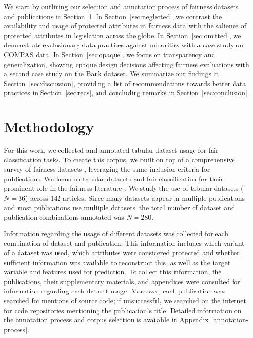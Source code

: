 We start by outlining our selection and annotation process of fairness datasets and publications in Section~\ref{sec:methods}. 
In Section~\ref{sec:neglected}, we contrast the availability and usage of protected attributes in fairness data with the salience of protected attributes in legislation across the globe. In Section~\ref{sec:omitted}, we demonstrate exclusionary data practices against minorities with a case study on COMPAS data. In Section~\ref{sec:opaque}, we focus on transparency and generalization, showing opaque design decisions affecting fairness evaluations with a second case study on the Bank dataset. We summarize our findings in Section~\ref{sec:discussion}, providing a list of recommendations towards better data practices in Section~\ref{sec:recs}, and concluding remarks in Section~\ref{sec:conclusion}.

\section{Methodology} \label{sec:methods}

For this work, we collected and annotated tabular dataset usage for fair classification tasks. To create this corpus, we built on top of a comprehensive survey of fairness datasets \citep{fabris2022algorithmic}, leveraging the same inclusion criteria for publications. We focus on tabular datasets and fair classification for their prominent role in the fairness literature \citep{fabris2022algorithmic,fabris2022tackling,mehrabi2022survey}. We study the use of tabular datasets ($N=36$) across 142 articles. Since many datasets appear in multiple publications and most publications use multiple datasets, the total number of dataset and publication combinations annotated was $N = 280$. 

Information regarding the usage of different datasets was collected for each combination of dataset and publication. This information includes which variant of a dataset was used, which attributes were considered protected and whether sufficient information was available to reconstruct this, as well as the target variable and features used for prediction. To collect this information, the publications, their supplementary materials, and appendices were consulted for information regarding each dataset usage. Moreover, each publication was searched for mentions of source code; if unsuccessful, we searched on the internet for code repositories mentioning the publication's title. Detailed information on the annotation process and corpus selection is available in Appendix~\ref{annotation-process}.

